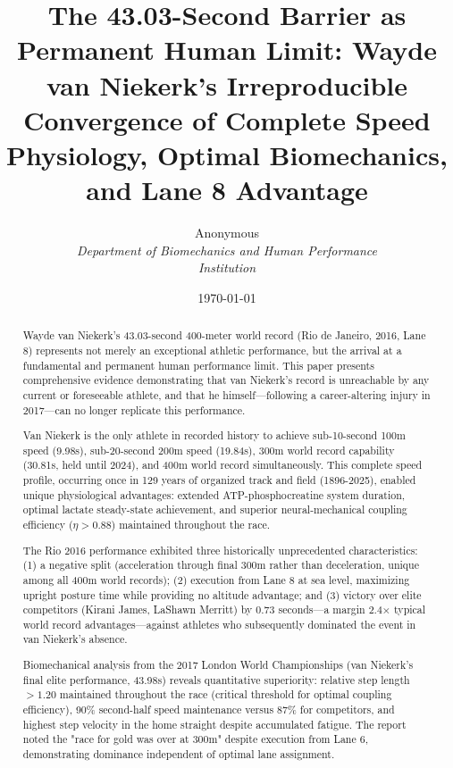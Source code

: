 \documentclass[twocolumn,10pt]{article}
\title{\textbf{The 43.03-Second Barrier as Permanent Human Limit: Wayde van Niekerk's Irreproducible Convergence of Complete Speed Physiology, Optimal Biomechanics, and Lane 8 Advantage}}
\author{
Anonymous\\
\textit{Department of Biomechanics and Human Performance}\\
\textit{Institution}
}
\date{\today}
\begin{document}
\maketitle

\begin{abstract}
Wayde van Niekerk's 43.03-second 400-meter world record (Rio de Janeiro, 2016, Lane 8) represents not merely an exceptional athletic performance, but the arrival at a fundamental and permanent human performance limit. This paper presents comprehensive evidence demonstrating that van Niekerk's record is unreachable by any current or foreseeable athlete, and that he himself—following a career-altering injury in 2017—can no longer replicate this performance.

Van Niekerk is the only athlete in recorded history to achieve sub-10-second 100m speed (9.98s), sub-20-second 200m speed (19.84s), 300m world record capability (30.81s, held until 2024), and 400m world record simultaneously. This complete speed profile, occurring once in 129 years of organized track and field (1896-2025), enabled unique physiological advantages: extended ATP-phosphocreatine system duration, optimal lactate steady-state achievement, and superior neural-mechanical coupling efficiency ($\eta > 0.88$) maintained throughout the race.

The Rio 2016 performance exhibited three historically unprecedented characteristics: (1) a negative split (acceleration through final 300m rather than deceleration, unique among all 400m world records); (2) execution from Lane 8 at sea level, maximizing upright posture time while providing no altitude advantage; and (3) victory over elite competitors (Kirani James, LaShawn Merritt) by 0.73 seconds—a margin 2.4× typical world record advantages—against athletes who subsequently dominated the event in van Niekerk's absence.

Biomechanical analysis from the 2017 London World Championships (van Niekerk's final elite performance, 43.98s) reveals quantitative superiority: relative step length $>1.20$ maintained throughout the race (critical threshold for optimal coupling efficiency), 90\% second-half speed maintenance versus 87\% for competitors, and highest step velocity in the home straight despite accumulated fatigue. The report noted the "race for gold was over at 300m" despite execution from Lane 6, demonstrating dominance independent of optimal lane assignment.


\end{abstract}
\end{document}
